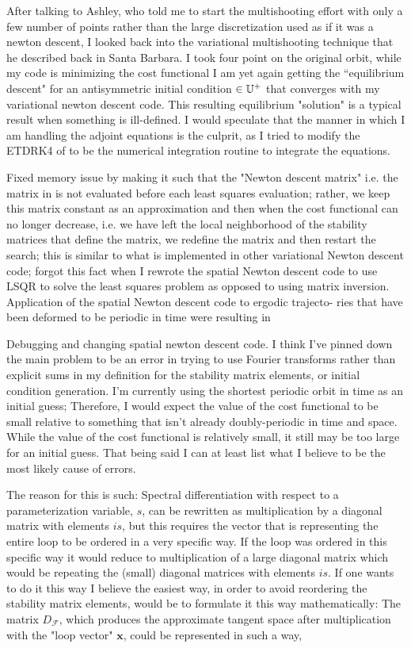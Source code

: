 After talking to Ashley, who told me to start the multishooting
effort with only a few number of points rather than the large
discretization used as if it was a {newton descent}, I looked back
into the variational multishooting technique that he described back
in Santa Barbara. I took four point on the original orbit, while
my code is minimizing the cost functional 
I am yet again getting the ``equilibrium descent" for an antisymmetric initial
condition $\in \mathbb{U}^+$ that converges with my variational {newton descent} code.
This resulting equilibrium "solution" is a typical result when
something is ill-defined. I would speculate that the manner in which
I am handling the adjoint equations is the culprit, as I tried to
modify the ETDRK4 of  to be the numerical integration
routine to integrate the equations.

Fixed memory issue by making it such that the
"Newton descent matrix" i.e. the matrix in is not evaluated
before each least squares evaluation; rather, we keep this matrix
constant as an approximation and then when the cost functional
can no longer decrease, i.e. we have left the local neighborhood of
the stability matrices that define the matrix, we redefine the matrix
and then restart the search; this is similar to what is implemented
in other variational Newton descent code; forgot this fact when I
rewrote the spatial Newton descent code to use LSQR to solve the
least squares problem as opposed to using matrix inversion.
Application of the spatial Newton descent code to ergodic trajecto-
ries that have been deformed to be periodic in time were resulting in

Debugging and changing spatial {newton descent} code.
I think I've pinned down the main problem
to be an error in trying to use Fourier transforms
rather than explicit sums in my definition
for the stability matrix elements, or initial
condition generation. I'm currently using the
shortest periodic orbit in time as an initial
guess; Therefore, I would expect the value
of the cost functional to be small relative to
something that isn't already doubly-periodic
in time and space. While the value of the cost
functional is relatively small, it still may
be too large for an initial guess.
That being said I can at least list what I
 believe to be the most likely cause of errors.

The reason for this is such: Spectral differentiation with respect to a parameterization variable,
$s$, can be rewritten as multiplication by a diagonal matrix with elements $is$, but this requires
the vector that is representing the entire loop to be ordered in a very specific way. If the loop
was ordered in this specific way it would reduce to multiplication of a large diagonal matrix which would
be repeating the (small) diagonal matrices with elements $is$. If one wants to do it this way I believe
the easiest way, in order to avoid reordering the stability matrix elements, would be to formulate it
this way mathematically: The matrix $D_{\mathcal{F}}$, which produces the approximate tangent space
after multiplication with the "loop vector" $\mathbf{x}$, could be represented in such a way,

